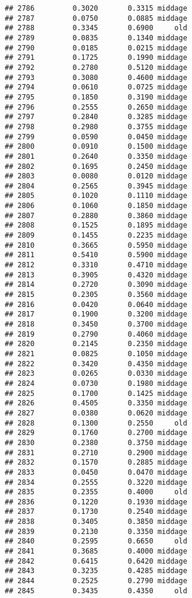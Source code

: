 \documentclass[
]{article}
\begin{document}
\begin{verbatim}
## 2786         0.3020       0.3315 middage
## 2787         0.0750       0.0885 middage
## 2788         0.3345       0.6900     old
## 2789         0.0835       0.1340 middage
## 2790         0.0185       0.0215 middage
## 2791         0.1725       0.1990 middage
## 2792         0.2780       0.5120 middage
## 2793         0.3080       0.4600 middage
## 2794         0.0610       0.0725 middage
## 2795         0.1850       0.3190 middage
## 2796         0.2555       0.2650 middage
## 2797         0.2840       0.3285 middage
## 2798         0.2980       0.3755 middage
## 2799         0.0590       0.0450 middage
## 2800         0.0910       0.1500 middage
## 2801         0.2640       0.3350 middage
## 2802         0.1695       0.2450 middage
## 2803         0.0080       0.0120 middage
## 2804         0.2565       0.3945 middage
## 2805         0.1020       0.1110 middage
## 2806         0.1060       0.1850 middage
## 2807         0.2880       0.3860 middage
## 2808         0.1525       0.1895 middage
## 2809         0.1455       0.2235 middage
## 2810         0.3665       0.5950 middage
## 2811         0.5410       0.5900 middage
## 2812         0.3310       0.4710 middage
## 2813         0.3905       0.4320 middage
## 2814         0.2720       0.3090 middage
## 2815         0.2305       0.3560 middage
## 2816         0.0420       0.0640 middage
## 2817         0.1900       0.3200 middage
## 2818         0.3450       0.3700 middage
## 2819         0.2790       0.4060 middage
## 2820         0.2145       0.2350 middage
## 2821         0.0825       0.1050 middage
## 2822         0.3420       0.4350 middage
## 2823         0.0265       0.0330 middage
## 2824         0.0730       0.1980 middage
## 2825         0.1700       0.1425 middage
## 2826         0.4505       0.3350 middage
## 2827         0.0380       0.0620 middage
## 2828         0.1300       0.2550     old
## 2829         0.1760       0.2700 middage
## 2830         0.2380       0.3750 middage
## 2831         0.2710       0.2900 middage
## 2832         0.1570       0.2885 middage
## 2833         0.0450       0.0470 middage
## 2834         0.2555       0.3220 middage
## 2835         0.2355       0.4000     old
## 2836         0.1220       0.1930 middage
## 2837         0.1730       0.2540 middage
## 2838         0.3405       0.3850 middage
## 2839         0.2130       0.3350 middage
## 2840         0.2595       0.6650     old
## 2841         0.3685       0.4000 middage
## 2842         0.6415       0.6420 middage
## 2843         0.3235       0.4285 middage
## 2844         0.2525       0.2790 middage
## 2845         0.3435       0.4350     old

\end{verbatim}
\end{document}
